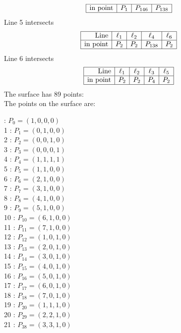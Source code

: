 \documentclass{article}
\begin{document}
{$$\begin{array}{|r*{3}{|c}|}
\hline
\mbox{in point}  & P_{1} & P_{146} & P_{138}\\
\hline
\end{array}
$$
Line 5 intersects 
$$
\begin{array}{|r*{4}{|c}|}
\hline
\mbox{Line}  & \ell_{1} & \ell_{2} & \ell_{4} & \ell_{6}\\
\hline
\mbox{in point}  & P_{2} & P_{2} & P_{138} & P_{2}\\
\hline
\end{array}
$$
Line 6 intersects 
$$
\begin{array}{|r*{4}{|c}|}
\hline
\mbox{Line}  & \ell_{1} & \ell_{2} & \ell_{3} & \ell_{5}\\
\hline
\mbox{in point}  & P_{2} & P_{2} & P_{4} & P_{2}\\
\hline
\end{array}
$$
The surface has 89 points:\\
The points on the surface are:\\
\begin{multicols}{3}
 : $P_{0}=( 1, 0, 0, 0 )$\\
1 : $P_{1}=( 0, 1, 0, 0 )$\\
2 : $P_{2}=( 0, 0, 1, 0 )$\\
3 : $P_{3}=( 0, 0, 0, 1 )$\\
4 : $P_{4}=( 1, 1, 1, 1 )$\\
5 : $P_{5}=( 1, 1, 0, 0 )$\\
6 : $P_{6}=( 2, 1, 0, 0 )$\\
7 : $P_{7}=( 3, 1, 0, 0 )$\\
8 : $P_{8}=( 4, 1, 0, 0 )$\\
9 : $P_{9}=( 5, 1, 0, 0 )$\\
10 : $P_{10}=( 6, 1, 0, 0 )$\\
11 : $P_{11}=( 7, 1, 0, 0 )$\\
12 : $P_{12}=( 1, 0, 1, 0 )$\\
13 : $P_{13}=( 2, 0, 1, 0 )$\\
14 : $P_{14}=( 3, 0, 1, 0 )$\\
15 : $P_{15}=( 4, 0, 1, 0 )$\\
16 : $P_{16}=( 5, 0, 1, 0 )$\\
17 : $P_{17}=( 6, 0, 1, 0 )$\\
18 : $P_{18}=( 7, 0, 1, 0 )$\\
19 : $P_{20}=( 1, 1, 1, 0 )$\\
20 : $P_{29}=( 2, 2, 1, 0 )$\\
21 : $P_{38}=( 3, 3, 1, 0 )$\\

\end{multicols}}
\end{document}
